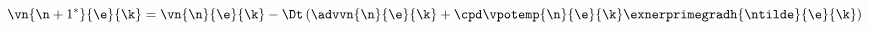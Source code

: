 $$\vn{\n+1^*}{\e}{\k} = \vn{\n}{\e}{\k} - \Dt \left( \advvn{\n}{\e}{\k} + \cpd \vpotemp{\n}{\e}{\k} \exnerprimegradh{\ntilde}{\e}{\k} \right)$$

